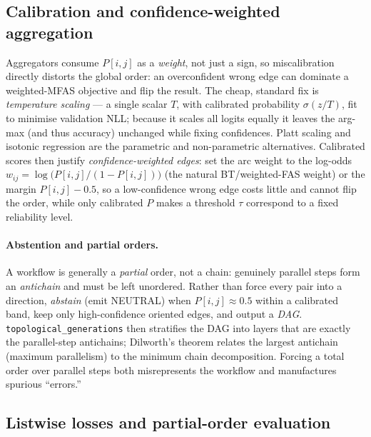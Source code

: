 \subsection{Calibration and confidence-weighted aggregation}
\label{sec:calibration}
Aggregators consume $P[i,j]$ as a \emph{weight}, not just a sign, so
miscalibration directly distorts the global order: an overconfident wrong edge can
dominate a weighted-MFAS objective and flip the result. The cheap, standard fix is
\emph{temperature scaling} \citep{ord:guo2017calibration} --- a single scalar
$T$, with calibrated probability $\sigma(z/T)$, fit to minimise validation NLL;
because it scales all logits equally it leaves the arg-max (and thus accuracy)
unchanged while fixing confidences. Platt scaling \citep{ord:platt1999} and
isotonic regression \citep{ord:zadrozny2002isotonic} are the parametric and
non-parametric alternatives. Calibrated scores then justify
\emph{confidence-weighted edges}: set the arc weight to the log-odds
$w_{ij} = \log\!\big(P[i,j]/(1-P[i,j])\big)$ (the natural BT/weighted-FAS weight)
or the margin $P[i,j]-0.5$, so a low-confidence wrong edge costs little and cannot
flip the order, while only calibrated $P$ makes a threshold $\tau$ correspond to a
fixed reliability level.

\paragraph{Abstention and partial orders.} A workflow is generally a
\emph{partial} order, not a chain: genuinely parallel steps form an
\emph{antichain} and must be left unordered. Rather than force every pair into a
direction, \emph{abstain} (emit NEUTRAL) when $P[i,j] \approx 0.5$ within a
calibrated band, keep only high-confidence oriented edges, and output a
\emph{DAG}. \texttt{topological\_generations} then stratifies the DAG into layers
that are exactly the parallel-step antichains; Dilworth's theorem
\citep{ord:dilworth1950} relates the largest antichain (maximum parallelism) to
the minimum chain decomposition. Forcing a total order over parallel steps both
misrepresents the workflow and manufactures spurious ``errors.''

\subsection{Listwise losses and partial-order evaluation}
\label{sec:listwise}
